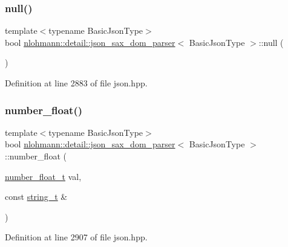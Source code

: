 \subsubsection{\texorpdfstring{null()}{null()}}
{\footnotesize\ttfamily template$<$typename Basic\+Json\+Type$>$ \\
bool \mbox{\hyperlink{classnlohmann_1_1detail_1_1json__sax__dom__parser}{nlohmann\+::detail\+::json\+\_\+sax\+\_\+dom\+\_\+parser}}$<$ Basic\+Json\+Type $>$\+::null (\begin{DoxyParamCaption}{ }\end{DoxyParamCaption})\hspace{0.3cm}{\ttfamily [inline]}}



Definition at line 2883 of file json.\+hpp.

\mbox{\label{classnlohmann_1_1detail_1_1json__sax__dom__parser_aef4652c0e81d6c052acb5d36afe09499}} 
\subsubsection{\texorpdfstring{number\_float()}{number\_float()}}
{\footnotesize\ttfamily template$<$typename Basic\+Json\+Type$>$ \\
bool \mbox{\hyperlink{classnlohmann_1_1detail_1_1json__sax__dom__parser}{nlohmann\+::detail\+::json\+\_\+sax\+\_\+dom\+\_\+parser}}$<$ Basic\+Json\+Type $>$\+::number\+\_\+float (\begin{DoxyParamCaption}\item[{\mbox{\hyperlink{classnlohmann_1_1detail_1_1json__sax__dom__parser_ad8da3aad0147b18b3cb76868480300fe}{number\+\_\+float\+\_\+t}}}]{val,  }\item[{const \mbox{\hyperlink{classnlohmann_1_1detail_1_1json__sax__dom__parser_afd4d961ab2a6b01cbe6e840f7fb90cdc}{string\+\_\+t}} \&}]{ }\end{DoxyParamCaption})\hspace{0.3cm}{\ttfamily [inline]}}



Definition at line 2907 of file json.\+hpp.

